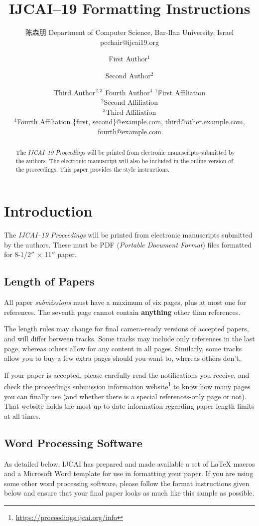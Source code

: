 \documentclass{article}
\title{IJCAI--19 Formatting Instructions}
\author{
    陈森朋
    \affiliations
    Department of Computer Science, Bar-Ilan University, Israel \emails
    pcchair@ijcai19.org
}
\author{
First Author$^1$
\and
Second Author$^2$\and
Third Author$^{2,3}$\And
Fourth Author$^4$
\affiliations
$^1$First Affiliation\\
$^2$Second Affiliation\\
$^3$Third Affiliation\\
$^4$Fourth Affiliation
\emails
\{first, second\}@example.com,
third@other.example.com,
fourth@example.com
}
\begin{document}
\maketitle

\begin{abstract}
  The {\it IJCAI--19 Proceedings} will be printed from electronic
  manuscripts submitted by the authors. The electronic manuscript will
  also be included in the online version of the proceedings. This paper
  provides the style instructions.
\end{abstract}

\section{Introduction}

The {\it IJCAI--19 Proceedings} will be printed from electronic
manuscripts submitted by the authors. These must be PDF ({\em Portable
Document Format}) files formatted for 8-1/2$''$ $\times$ 11$''$ paper.

\subsection{Length of Papers}

All paper {\em submissions} must have a maximum of six pages, plus at most one for references. The seventh page cannot contain {\bf anything} other than references.

The length rules may change for final camera-ready versions of accepted papers, and will differ between tracks. Some tracks may include only references in the last page, whereas others allow for any content in all pages. Similarly, some tracks allow you to buy a few extra pages should you want to, whereas others don't.

If your paper is accepted, please carefully read the notifications you receive, and check the proceedings submission information website\footnote{\url{https://proceedings.ijcai.org/info}} to know how many pages you can finally use (and whether there is a special references-only page or not). That website holds the most up-to-date information regarding paper length limits at all times.

\subsection{Word Processing Software}

As detailed below, IJCAI has prepared and made available a set of
\LaTeX{} macros and a Microsoft Word template for use in formatting
your paper. If you are using some other word processing software, please follow the format instructions given below and ensure that your final paper looks as much like this sample as possible.
\end{document}
